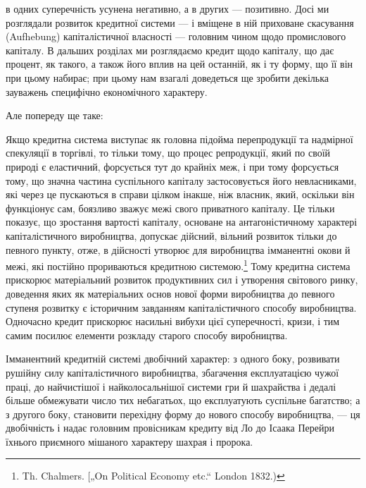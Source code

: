 \parcont{}  %
в одних суперечність усунена негативно, а в других — позитивно.
Досі ми розглядали розвиток кредитної системи — і вміщене
в ній приховане скасування (Aufhebung) капіталістичної власності — головним чином щодо промислового
капіталу. В дальших розділах ми розглядаємо кредит щодо капіталу, що дає процент, як
такого, а також його вплив на цей останній, як і ту форму, що
її він при цьому набирає; при цьому нам взагалі доведеться ще
зробити декілька зауважень специфічно економічного характеру.

Але попереду ще таке:

Якщо кредитна система виступає як головна підойма перепродукції та надмірної спекуляції в торгівлі,
то тільки тому,
що процес репродукції, який по своїй природі є еластичний,
форсується тут до крайніх меж, і при тому форсується тому,
що значна частина суспільного капіталу застосовується його
невласниками, які через це пускаються в справи цілком інакше,
ніж власник, який, оскільки він функціонує сам, боязливо зважує
межі свого приватного капіталу. Це тільки показує, що зростання вартості капіталу, основане на
антагоністичному характері
капіталістичного виробництва, допускає дійсний, вільний розвиток тільки до певного пункту, отже, в
дійсності утворює для виробництва імманентні окови й межі, які постійно прориваються
кредитною системою.\footnote{
Th. Chalmers. [„On Political Economy etc.“ London 1832.)
} Тому кредитна система прискорює матеріальний розвиток продуктивних сил і
утворення світового ринку,
доведення яких як матеріальних основ нової форми виробництва
до певного ступеня розвитку є історичним завданням капіталістичного способу виробництва. Одночасно
кредит прискорює насильні вибухи цієї суперечності, кризи, і тим самим посилює елементи розкладу
старого способу виробництва.

Імманентний кредитній системі двобічний характер: з одного
боку, розвивати рушійну силу капіталістичного виробництва,
збагачення експлуатацією чужої праці, до найчистішої і найколосальнішої системи гри й шахрайства і
дедалі більше обмежувати число тих небагатьох, що експлуатують суспільне багатство; а з другого
боку, становити перехідну форму до нового
способу виробництва, — ця двобічність і надає головним провісникам кредиту від Ло до Ісаака Перейри
їхнього приємного мішаного характеру шахрая і пророка.
